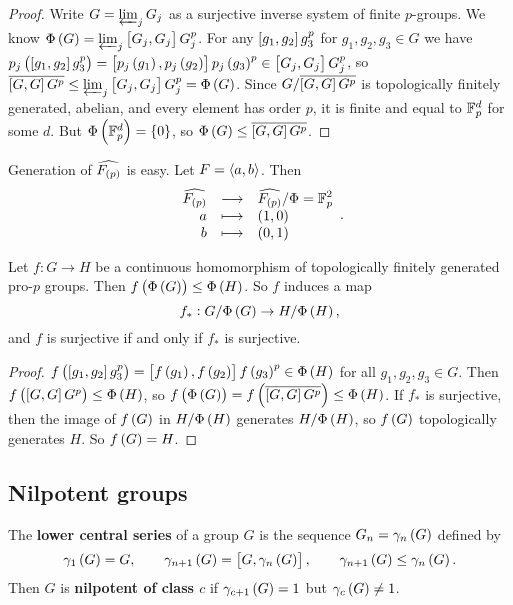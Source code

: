 \begin{proof}
Write $ G = \varprojlim_j G_j $ as a surjective inverse system of finite $ p $-groups. We know $ \Phi\br{G} = \varprojlim_j \sbr{G_j, G_j}G_j^p $. For any $ \sbr{g_1, g_2}g_3^p $ for $ g_1, g_2, g_3 \in G $ we have $ p_j\br{\sbr{g_1, g_2}g_3^p} = \sbr{p_j\br{g_1}, p_j\br{g_2}}p_j\br{g_3}^p \in \sbr{G_j, G_j}G_j^p $, so $ \overline{\sbr{G, G}G^p} \le \varprojlim_j \sbr{G_j, G_j}G_j^p = \Phi\br{G} $. Since $ G / \overline{\sbr{G, G}G^p} $ is topologically finitely generated, abelian, and every element has order $ p $, it is finite and equal to $ \mathbb{F}_p^d $ for some $ d $. But $ \Phi\br{\FF_p^d} = \cbr{0} $, so $ \Phi\br{G} \le \overline{\sbr{G, G}G^p} $.
\end{proof}

\begin{example}
Generation of $ \widehat{F_{\br{p}}} $ is easy. Let $ F = \left\langle a, b \right\rangle $. Then
$$ \functions{\widehat{F_{\br{p}}}}{\widehat{F_{\br{p}}} / \Phi = \FF_p^2}{a}{\br{1, 0}}{b}{\br{0, 1}}. $$
\end{example}

\begin{corollary}
Let $ f : G \to H $ be a continuous homomorphism of topologically finitely generated pro-$ p $ groups. Then $ f\br{\Phi\br{G}} \le \Phi\br{H} $. So $ f $ induces a map
$$ f_* : G / \Phi\br{G} \to H / \Phi\br{H}, $$
and $ f $ is surjective if and only if $ f_* $ is surjective.
\end{corollary}

\begin{proof}
$ f\br{\sbr{g_1, g_2}g_3^p} = \sbr{f\br{g_1}, f\br{g_2}}f\br{g_3}^p \in \Phi\br{H} $ for all $ g_1, g_2, g_3 \in G $. Then $ f\br{\sbr{G, G}G^p} \le \Phi\br{H} $, so $ f\br{\Phi\br{G}} = f\br{\overline{\sbr{G, G}G^p}} \le \Phi\br{H} $. If $ f_* $ is surjective, then the image of $ f\br{G} $ in $ H / \Phi\br{H} $ generates $ H / \Phi\br{H} $, so $ f\br{G} $ topologically generates $ H $. So $ f\br{G} = H $.
\end{proof}

\pagebreak

\subsection{Nilpotent groups}


\begin{definition}
The \textbf{lower central series} of a group $ G $ is the sequence $ G_n = \gamma_n\br{G} $ defined by
$$ \gamma_1\br{G} = G, \qquad \gamma_{n + 1}\br{G} = \sbr{G, \gamma_n\br{G}}, \qquad \gamma_{n + 1}\br{G} \le \gamma_n\br{G}. $$
Then $ G $ is \textbf{nilpotent of class $ c $} if $ \gamma_{c + 1}\br{G} = 1 $ but $ \gamma_c\br{G} \ne 1 $.
\end{definition}

